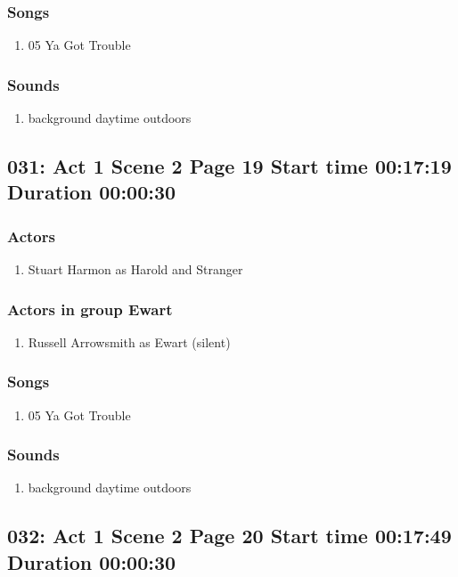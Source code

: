 \subsubsection{Songs}
\begin{enumerate}
\item 05 Ya Got Trouble
\end{enumerate}\subsubsection{Sounds}
\begin{enumerate}
\item background daytime outdoors
\end{enumerate}
\subsection{031: Act 1 Scene 2 Page 19 Start time 00:17:19 Duration 00:00:30}

\subsubsection{Actors}
\begin{enumerate}
\item Stuart Harmon as Harold and Stranger
\end{enumerate}
\subsubsection{Actors in group Ewart}
\begin{enumerate}
\item Russell Arrowsmith as Ewart (silent)
\end{enumerate}

\subsubsection{Songs}
\begin{enumerate}
\item 05 Ya Got Trouble
\end{enumerate}\subsubsection{Sounds}
\begin{enumerate}
\item background daytime outdoors
\end{enumerate}
\subsection{032: Act 1 Scene 2 Page 20 Start time 00:17:49 Duration 00:00:30}

